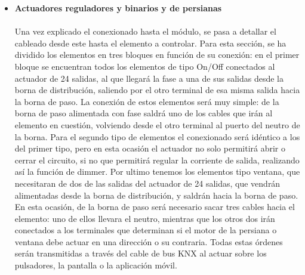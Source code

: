 \begin{itemize}
\item \textbf{Actuadores reguladores y binarios y de persianas} \\ \\
Una vez explicado el conexionado hasta el módulo, se pasa a detallar el cableado desde este hasta el elemento a controlar. Para esta sección, se ha dividido los elementos en tres bloques en función de su conexión: en el primer bloque se encuentran todos los elementos de tipo On/Off conectados al actuador de 24 salidas, al que llegará la fase a una de sus salidas desde la borna de distribución, saliendo por el otro terminal de esa misma salida hacia la borna de paso. La conexión de estos elementos será muy simple: de la borna de paso alimentada con fase saldrá uno de los cables que irán al elemento en cuestión, volviendo desde el otro terminal al puerto del neutro de la borna. Para el segundo tipo de elementos el conexionado será idéntico a los del primer tipo, pero en esta ocasión el actuador no solo permitirá abrir o cerrar el circuito, si no que permitirá regular la corriente de salida, realizando así la función de dimmer. Por ultimo tenemos los elementos tipo ventana, que necesitaran de dos de las salidas del actuador de 24 salidas, que vendrán alimentadas desde la borna de distribución, y saldrán hacia la borna de paso. En esta ocasión, de la borna de paso será necesario sacar tres cables hacia el elemento: uno de ellos llevara el neutro, mientras que los otros dos irán conectados a los terminales que determinan si el motor de la persiana o ventana debe actuar en una dirección o su contraria. Todas estas órdenes serán transmitidas a través del cable de bus KNX al actuar sobre los pulsadores, la pantalla o la aplicación móvil.
\end{itemize}

